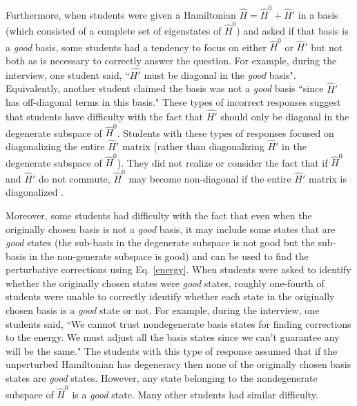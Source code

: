 \documentclass[aps,pra,showpacs,showkeys,twocolumn,groupedaddress]{revtex4-1}
\begin{document}
Furthermore, when students were given a Hamiltonian $\hat{H}= \hat{H}^0+\hat{H}'$ in a basis (which consisted of a complete set of eigenstates of $\hat{H}^0$) and asked if that basis is a {\it good} basis, some students had a tendency to focus on either $\hat{H}^0$ or $\hat{H}'$ but not both as is necessary to correctly answer the question.  For example, during the interview, one student said, ``$\hat{H'}$ must be diagonal in the {\it good} basis". Equivalently, another student claimed the basis was not a {\it good} basis ``since $\hat{H}'$ has off-diagonal terms in this basis." These types of incorrect responses suggest that students have difficulty with the fact that $\hat{H'}$ should only be diagonal in the degenerate subspace of $\hat{H}^0$.
Students with these types of responses focused on diagonalizing the entire $\hat{H}'$ matrix (rather than diagonalizing $\hat{H}'$ in the degenerate subspace of $\hat{H}^0$). They did not realize or consider the fact that if $\hat{H}^0$ and $\hat{H}'$ do not commute, $\hat{H}^0$ may become non-diagonal if the entire $\hat{H}'$ matrix is diagonalized .  



Moreover, some students had difficulty with the fact that even when the originally chosen basis is not a {\it {\it good}} basis, it may include some states that are {\it {\it good}} states (the sub-basis in the degenerate subspace is not good but the sub-basis in the non-generate subspace is good) and can be used to find the perturbative corrections using Eq. \ref{energy}.  When students were asked to identify whether the originally chosen states were {\it {\it good}} states, roughly one-fourth 
of students 
were unable to correctly identify whether each state in the originally chosen basis is a {\it {\it good}} state or not.   For example, during the interview, one students said, ``We cannot trust nondegenerate basis states for finding corrections to the energy.   We must adjust all the basis states since we can't guarantee any will be the same."  The students with this type of response assumed that if the unperturbed Hamiltonian has degeneracy then none of the originally chosen basis states are {\it good} states. However, any state belonging to the nondegenerate subspace of $\hat{H}^0$ is a {\it {\it good}} state.  Many other students had similar difficulty.  
\end{document}
